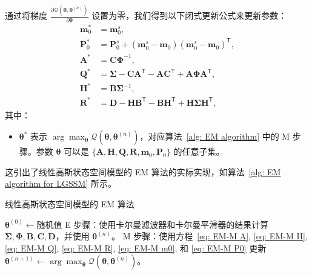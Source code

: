 通过将梯度 \(\frac{\partial \mathcal{Q} (\boldsymbol{\theta}, \boldsymbol{\theta}^{(n)})}{\partial \boldsymbol{\theta}}\) 设置为零，我们得到以下闭式更新公式来更新参数：
\begin{align}
    \mathbf{m}_0^* &= \mathbf{m}_0^s, \label{eq: EM-M m0} \\
    \mathbf{P}_0^* &= \mathbf{P}_0^s + (\mathbf{m}_0^s - \mathbf{m}_0)(\mathbf{m}_0^s - \mathbf{m}_0)^{\mathsf{T}}, \label{eq: EM-M P0} \\
    \mathbf{A}^* &= \mathbf{C} \boldsymbol{\Phi}^{-1}, \label{eq: EM-M A} \\
    \mathbf{Q}^* &= \boldsymbol{\Sigma} - \mathbf{C} \mathbf{A}^{\mathsf{T}} - \mathbf{A} \mathbf{C}^{\mathsf{T}} + \mathbf{A} \boldsymbol{\Phi} \mathbf{A}^{\mathsf{T}}, \label{eq: EM-M Q} \\
    \mathbf{H}^* &= \mathbf{B} \boldsymbol{\Sigma}^{-1}, \label{eq: EM-M H} \\
    \mathbf{R}^* &= \mathbf{D} - \mathbf{H} \mathbf{B}^{\mathsf{T}} - \mathbf{B} \mathbf{H}^{\mathsf{T}} + \mathbf{H} \boldsymbol{\Sigma} \mathbf{H}^{\mathsf{T}}, \label{eq: EM-M R}
\end{align}
其中：
\begin{itemize}
    \item \(\boldsymbol{\theta}^*\) 表示 \(\arg \max_{\boldsymbol{\theta}} \mathcal{Q}(\boldsymbol{\theta}, \boldsymbol{\theta}^{(n)})\)，对应算法~\ref{alg: EM algorithm} 中的 M 步骤。参数 \(\boldsymbol{\theta}\) 可以是 \(\{ \mathbf{A}, \mathbf{H}, \mathbf{Q}, \mathbf{R}, \mathbf{m}_0, \mathbf{P}_0 \}\) 的任意子集。
\end{itemize}

这引出了线性高斯状态空间模型的 EM 算法的实际实现，如算法~\ref{alg: EM algorithm for LGSSM} 所示。

\begin{algorithm}[h]
    \caption{线性高斯状态空间模型的 EM 算法}
    \label{alg: EM algorithm for LGSSM}
    \begin{algorithmic}[1]
        \STATE \(\boldsymbol{\theta}^{(0)} \gets \text{随机值}\)
            \STATE E 步骤：使用卡尔曼滤波器和卡尔曼平滑器的结果计算 \(\boldsymbol{\Sigma}, \boldsymbol{\Phi}, \mathbf{B}, \mathbf{C}, \mathbf{D}\)，并使用 \(\boldsymbol{\theta}^{(n)}\)。
            \STATE M 步骤：使用方程~\eqref{eq: EM-M A}, \eqref{eq: EM-M H}, \eqref{eq: EM-M Q}, \eqref{eq: EM-M R}, \eqref{eq: EM-M m0}, 和 \eqref{eq: EM-M P0} 更新 \(\boldsymbol{\theta}^{(n+1)} \gets \arg \max_{\boldsymbol{\theta}} \mathcal{Q}(\boldsymbol{\theta}, \boldsymbol{\theta}^{(n)})\)。
        \ENDFOR
    \end{algorithmic}
\end{algorithm}
